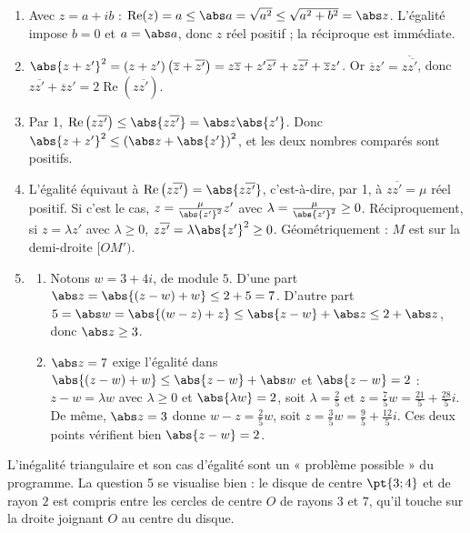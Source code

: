 \begin{solution}[Problème]
\begin{enumerate}
\item Avec $z=a+ib$ : $\operatorname{Re}(z)=a\le\abs a=\sqrt{a^2}\le\sqrt{a^2+b^2}=\abs z$. L'égalité impose $b=0$ et $a=\abs a$, donc $z$ réel positif ; la réciproque est immédiate.
\item $\abs{z+z'}^2=(z+z')\left(\overline z+\overline{z'}\right)=z\overline z+z'\overline{z'}+z\overline{z'}+\overline z z'$. Or $\overline z z'=\overline{z\overline{z'}}$, donc $z\overline{z'}+\overline z z'=2\operatorname{Re}\left(z\overline{z'}\right)$.
\item Par 1, $\operatorname{Re}\left(z\overline{z'}\right)\le\abs{z\overline{z'}}=\abs z\abs{z'}$. Donc $\abs{z+z'}^2\le\left(\abs z+\abs{z'}\right)^2$, et les deux nombres comparés sont positifs.
\item L'égalité équivaut à $\operatorname{Re}\left(z\overline{z'}\right)=\abs{z\overline{z'}}$, c'est-à-dire, par 1, à $z\overline{z'}=\mu$ réel positif. Si c'est le cas, $z=\frac{\mu}{\abs{z'}^2}z'$ avec $\lambda=\frac{\mu}{\abs{z'}^2}\ge0$. Réciproquement, si $z=\lambda z'$ avec $\lambda\ge0$, $z\overline{z'}=\lambda\abs{z'}^2\ge0$. Géométriquement : $M$ est sur la demi-droite $[OM')$.
\item
\begin{enumerate}
\item Notons $w=3+4i$, de module $5$. D'une part $\abs z=\abs{(z-w)+w}\le2+5=7$. D'autre part $5=\abs w=\abs{(w-z)+z}\le\abs{z-w}+\abs z\le2+\abs z$, donc $\abs z\ge3$.
\item $\abs z=7$ exige l'égalité dans $\abs{(z-w)+w}\le\abs{z-w}+\abs w$ et $\abs{z-w}=2$ : $z-w=\lambda w$ avec $\lambda\ge0$ et $\abs{\lambda w}=2$, soit $\lambda=\frac25$ et $z=\frac75w=\frac{21}5+\frac{28}5i$. De même, $\abs z=3$ donne $w-z=\frac25w$, soit $z=\frac35w=\frac95+\frac{12}5i$. Ces deux points vérifient bien $\abs{z-w}=2$.
\end{enumerate}
\end{enumerate}
\end{solution}
\begin{teachernote}
L'inégalité triangulaire et son cas d'égalité sont un « problème possible » du programme. La question 5 se visualise bien : le disque de centre $\pt{3;4}$ et de rayon $2$ est compris entre les cercles de centre $O$ de rayons $3$ et $7$, qu'il touche sur la droite joignant $O$ au centre du disque.
\end{teachernote}

